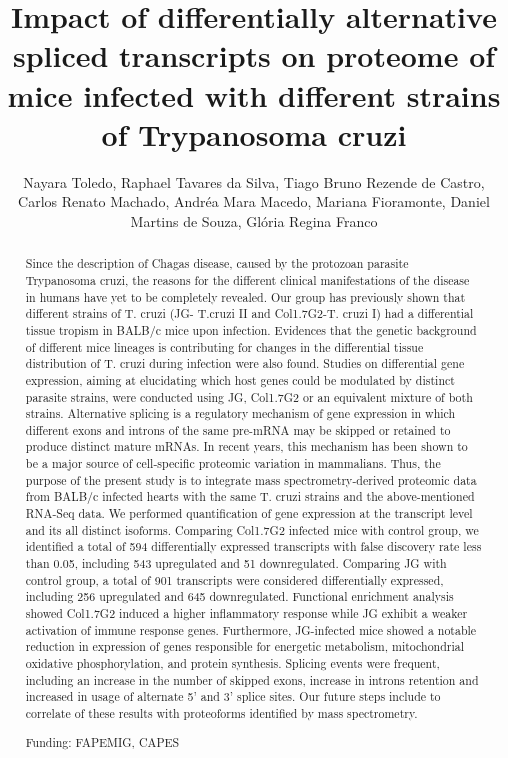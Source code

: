 \documentclass[twoside]{article}
\title{\vspace{-15mm}\fontsize{24pt}{10pt}\selectfont\textbf{ Impact of differentially alternative spliced transcripts on proteome of mice infected with different strains of Trypanosoma cruzi }} %
\author{ Nayara Toledo, Raphael Tavares da Silva, Tiago Bruno Rezende de Castro, Carlos Renato Machado, Andr\'ea Mara Macedo, Mariana Fioramonte, Daniel Martins de Souza, Gl\'oria Regina Franco }
\affil{ Universidade Federal de Minas Gerais }
\date{}
\begin{document}
  
  
  \maketitle %
  
  
  \thispagestyle{fancy} %
  
  
  \begin{abstract}
  Since the description of Chagas disease,  caused by the protozoan parasite Trypanosoma cruzi,  the reasons for the different clinical manifestations of the disease in humans have yet to be completely revealed. Our group has previously shown that different strains of T. cruzi (JG- T.cruzi II and Col1.7G2-T. cruzi I) had a differential tissue tropism in BALB/c mice upon infection. Evidences that the genetic background of different mice lineages is contributing for changes in the differential tissue distribution of T. cruzi during infection were also found. Studies on differential gene expression,  aiming at elucidating which host genes could be modulated by distinct parasite strains,  were conducted using JG,  Col1.7G2 or an equivalent mixture of both strains. Alternative splicing is a regulatory mechanism of gene expression in which different exons and introns of the same pre-mRNA may be skipped or retained to produce distinct mature mRNAs. In recent years,  this mechanism has been shown to be a major source of cell-specific proteomic variation in mammalians. Thus,  the purpose of the present study is to integrate mass spectrometry-derived proteomic data from BALB/c infected hearts with the same T. cruzi strains and the above-mentioned RNA-Seq data. We performed quantification of gene expression at the transcript level and its all distinct isoforms. Comparing Col1.7G2 infected mice with control group,  we identified a total of 594 differentially expressed transcripts with false discovery rate less than 0.05,  including 543 upregulated and 51 downregulated. Comparing JG with control group,  a total of 901 transcripts were considered differentially expressed,  including 256 upregulated and 645 downregulated. Functional enrichment analysis showed Col1.7G2 induced a higher inflammatory response while JG exhibit a weaker activation of immune response genes. Furthermore,  JG-infected mice showed a notable reduction in expression of genes responsible for energetic metabolism,  mitochondrial oxidative phosphorylation,  and protein synthesis. Splicing events were frequent,  including an increase in the number of skipped exons,  increase in introns retention and increased in usage of alternate 5’ and 3’ splice sites. Our future steps include to correlate of these results with proteoforms identified by mass spectrometry.
  
  Funding: FAPEMIG,  CAPES \\ 
  \end{abstract}
  
\end{document}
